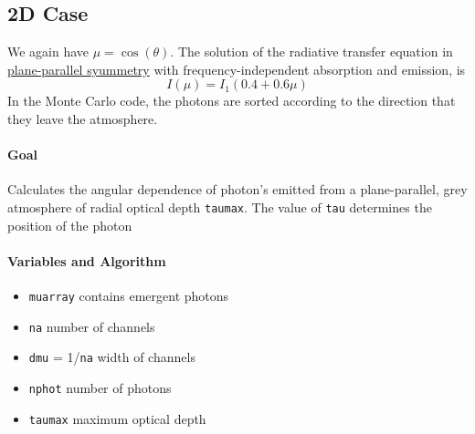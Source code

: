 \documentclass[../main/main.tex]{subfiles}
\begin{document}
\noindent{}

\subsection{2D Case}
We again have $\mu = \cos(\theta)$. The solution of the radiative transfer equation in \underline{plane-parallel syummetry} with frequency-independent absorption and emission, is 
\begin{equation}
I(\mu) = I_1 (0.4 + 0.6\mu)
\end{equation}
In the Monte Carlo code, the photons are sorted according to the direction that they leave the atmosphere.

\paragraph{Goal}
Calculates the angular dependence of photon's emitted from a plane-parallel, grey atmosphere of radial optical depth \texttt{taumax}. The value of \texttt{tau} determines the position of the photon

\paragraph{Variables and Algorithm}
\begin{itemize}
\item \texttt{muarray} contains emergent photons
\item \texttt{na} number of channels
\item \texttt{dmu} = 1/\texttt{na} width of channels
\item \texttt{nphot} number of photons
\item \texttt{taumax} maximum optical depth
\end{itemize}
\end{document}
